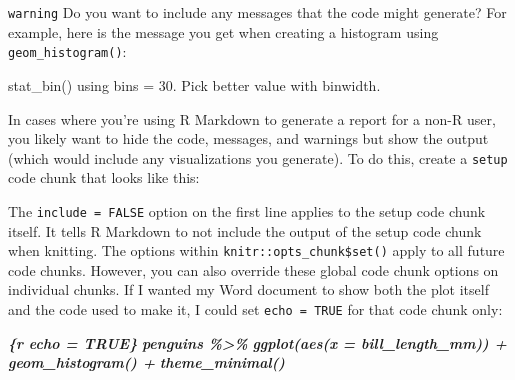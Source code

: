 \documentclass[
]{book}
\newenvironment{Shaded}{\begin{snugshade}}{\end{snugshade}}
\newcommand{\InformationTok}[1]{\textcolor[rgb]{0.56,0.35,0.01}{\textbf{\textit{#1}}}}
\newcommand{\NormalTok}[1]{#1}
\begin{document}
\texttt{warning}
Do you want to include any messages that the code might generate? For example, here is the message you get when creating a histogram using \texttt{geom\_histogram()}:

\begin{Shaded}
\begin{Highlighting}[]
\NormalTok{\textasciigrave{}stat\_bin()\textasciigrave{} using \textasciigrave{}bins = 30\textasciigrave{}. Pick better value with \textasciigrave{}binwidth\textasciigrave{}.}
\end{Highlighting}
\end{Shaded}

In cases where you're using R Markdown to generate a report for a non-R user, you likely want to hide the code, messages, and warnings but show the output (which would include any visualizations you generate). To do this, create a \texttt{setup} code chunk that looks like this:

\begin{Shaded}
\end{Shaded}

The \texttt{include\ =\ FALSE} option on the first line applies to the setup code chunk itself. It tells R Markdown to not include the output of the setup code chunk when knitting. The options within \texttt{knitr::opts\_chunk\$set()} apply to all future code chunks. However, you can also override these global code chunk options on individual chunks. If I wanted my Word document to show both the plot itself and the code used to make it, I could set \texttt{echo\ =\ TRUE} for that code chunk only:

\begin{Shaded}
\begin{Highlighting}[]
\InformationTok{\textasciigrave{}\textasciigrave{}\textasciigrave{}\{r echo = TRUE\}}
\InformationTok{penguins \%\textgreater{}\%}
\InformationTok{  ggplot(aes(x = bill\_length\_mm)) +}
\InformationTok{  geom\_histogram() +}
\InformationTok{  theme\_minimal()}
\InformationTok{\textasciigrave{}\textasciigrave{}\textasciigrave{}}
\end{Highlighting}
\end{Shaded}
\end{document}
